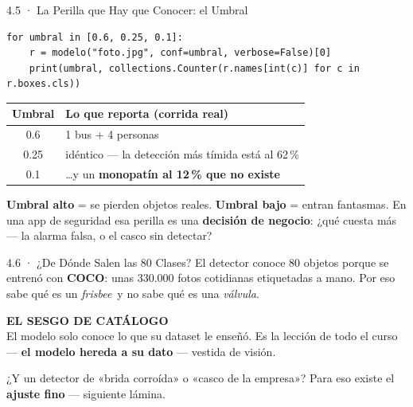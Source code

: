 \documentclass[aspectratio=169, 11pt]{beamer}
\begin{document}
\begin{frame}[fragile, shrink=5]{4.5 · La Perilla que Hay que Conocer: el Umbral}
  \vspace{-2pt}
  \begin{verbatim}
for umbral in [0.6, 0.25, 0.1]:
    r = modelo("foto.jpg", conf=umbral, verbose=False)[0]
    print(umbral, collections.Counter(r.names[int(c)] for c in r.boxes.cls))
  \end{verbatim}
  \vspace{1pt}
  \begin{center}
  {\footnotesize
  \begin{tabular}{cl}
    \toprule
    \textbf{Umbral} & \textbf{Lo que reporta (corrida real)} \\
    \midrule
    0.6 & 1 bus + 4 personas \\[1pt]
    0.25 & idéntico --- la detección más tímida está al 62\,\% \\[1pt]
    0.1 & \ldots y un \textbf{monopatín al 12\,\% que no existe} \\
    \bottomrule
  \end{tabular}}
  \end{center}
  \vspace{2pt}
  \begin{tcolorbox}[colback=arcaGray, colframe=arcaRed, boxrule=0pt,
    leftrule=3pt, arc=3pt, left=8pt, right=8pt, top=3pt, bottom=3pt]
    {\scriptsize\color{textMuted}
     \textbf{\color{arcaRed}Umbral alto} = se pierden objetos reales.
     \textbf{\color{arcaRed}Umbral bajo} = entran fantasmas. En una app de
     seguridad esa perilla es una \textbf{decisión de negocio}: ¿qué cuesta
     más --- la alarma falsa, o el casco sin detectar?}
  \end{tcolorbox}
\end{frame}

\begin{frame}[shrink=5]{4.6 · ¿De Dónde Salen las 80 Clases?}
  \vspace{2pt}
  {\footnotesize\color{textMuted}
   El detector conoce 80 objetos porque se entrenó con \textbf{COCO}: unas
   330.000 fotos cotidianas etiquetadas a mano. Por eso sabe qué es un
   \emph{frisbee}\ y no sabe qué es una \emph{válvula}.}
  \vspace{6pt}
  \begin{tcolorbox}[colback=arcaGray, colframe=arcaRed, boxrule=0pt,
    leftrule=4pt, arc=3pt, left=10pt, right=10pt, top=5pt, bottom=5pt]
    {\scriptsize\color{arcaRed}\bfseries EL SESGO DE CATÁLOGO}\\[2pt]
    {\footnotesize\color{textMuted}
     El modelo solo conoce lo que su dataset le enseñó. Es la lección de
     todo el curso --- \textbf{el modelo hereda a su dato} --- vestida de
     visión.}
  \end{tcolorbox}
  \vspace{6pt}
  {\footnotesize\color{textMuted}
   ¿Y un detector de «brida corroída» o «casco de la empresa»? Para eso
   existe el \textbf{ajuste fino} --- siguiente lámina.}
\end{frame}
\end{document}
